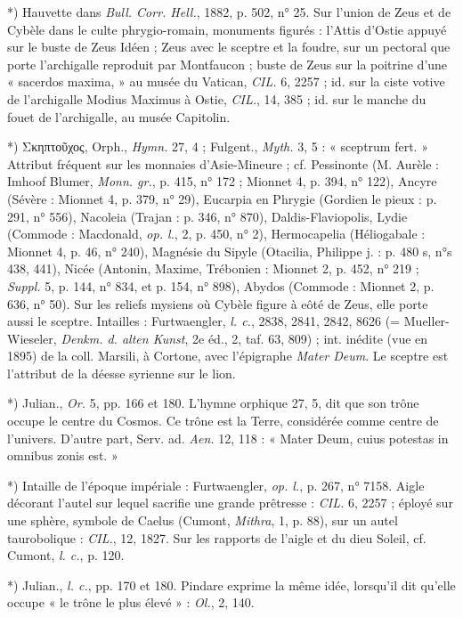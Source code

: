 \documentclass[a4paper, 11pt, oneside, polutonikogreek, french]{article}
\begin{document}
*) Hauvette dans \emph{Bull. Corr. Hell.}, 1882, p. 502, n° 25. Sur l'union de Zeus et de Cybèle dans le culte phrygio-romain, monuments figurés : l'Attis d'Ostie appuyé sur le buste de Zeus Idéen ; Zeus avec le sceptre et la foudre, sur un pectoral que porte l'archigalle reproduit par Montfaucon ; buste de Zeus sur la poitrine d'une « sacerdos maxima, » au musée du Vatican, \emph{CIL.} 6, 2257 ; id. sur la ciste votive de l'archigalle Modius Maximus à Ostie, \emph{CIL.}, 14, 385 ; id. sur le manche du fouet de l'archigalle, au musée Capitolin.

*) Σκηπτοῦχος, Orph., \emph{Hymn.} 27, 4 ; Fulgent., \emph{Myth.} 3, 5 : « sceptrum fert. » Attribut fréquent sur les monnaies d'Asie-Mineure ; cf. Pessinonte (M. Aurèle : Imhoof Blumer, \emph{Monn. gr.}, p. 415, n° 172 ; Mionnet 4, p. 394, n° 122), Ancyre (Sévère : Mionnet 4, p. 379, n° 29), Eucarpia en Phrygie (Gordien le pieux : p. 291, n° 556), Nacoleia (Trajan : p. 346, n° 870), Daldis-Flaviopolis, Lydie (Commode : Macdonald, \emph{op. l.}, 2, p. 450, n° 2), Hermocapelia (Héliogabale : Mionnet 4, p. 46, n° 240), Magnésie du Sipyle (Otacilia, Philippe j. : p. 480 s, n°s 438, 441), Nicée (Antonin, Maxime, Trébonien : Mionnet 2, p. 452, n° 219 ; \emph{Suppl.} 5, p. 144, n° 834, et p. 154, n° 898), Abydos (Commode : Mionnet 2, p. 636, n° 50). Sur les reliefs mysiens où Cybèle figure à eôté de Zeus, elle porte aussi le sceptre. Intailles : Furtwaengler, \emph{l. c.}, 2838, 2841, 2842, 8626 (= Mueller-Wieseler, \emph{Denkm. d. alten Kunst}, 2e éd., 2, taf. 63, 809) ; int. inédite (vue en 1895) de la coll. Marsili, à Cortone, avec l'épigraphe \emph{Mater Deum}. Le sceptre est l'attribut de la déesse syrienne sur le lion.

*) Julian., \emph{Or.} 5, pp. 166 et 180. L'hymne orphique 27, 5, dit que son trône occupe le centre du Cosmos. Ce trône est la Terre, considérée comme centre de l'univers. D'autre part, Serv. ad. \emph{Aen.} 12, 118 : « Mater Deum, cuius potestas in omnibus zonis est. »

*) Intaille de l'époque impériale : Furtwaengler, \emph{op. l.}, p. 267, n° 7158. Aigle décorant l'autel sur lequel sacrifie une grande prêtresse : \emph{CIL.} 6, 2257 ; éployé sur une sphère, symbole de Caelus (Cumont, \emph{Mithra}, 1, p. 88), sur un autel taurobolique : \emph{CIL.}, 12, 1827. Sur les rapports de l'aigle et du dieu Soleil, cf. Cumont, \emph{l. c.}, p. 120.

*) Julian., \emph{l. c.}, pp. 170 et 180. Pindare exprime la même idée, lorsqu'il dit qu'elle occupe « le trône le plus élevé » : \emph{Ol.}, 2, 140.
\end{document}
